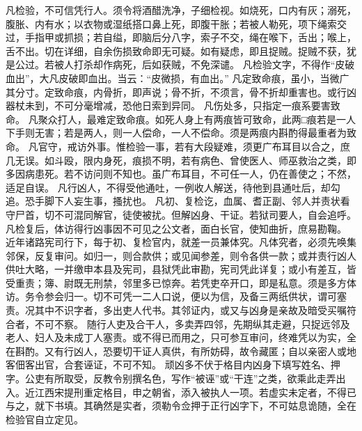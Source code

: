 \documentclass[12pt,UTF8]{ctexbook}
\begin{document}
凡检验，不可信凭行人。须令将酒醋洗净，子细检视。如烧死，口内有灰；溺死，腹胀、内有水；以衣物或湿纸搭口鼻上死，即腹干胀；若被人勒死，项下绳索交过，手指甲或抓损；若自缢，即脑后分八字，索子不交，绳在喉下，舌出；喉上，舌不出。切在详细，自余伤损致命即无可疑。如有疑虑，即且捉贼。捉贼不获，犹是公过。若被人打杀却作病死，后如获贼，不免深谴。
凡检验文字，不得作“皮破血出”，大凡皮破即血出。当云：“皮微损，有血出。”
凡定致命痕，虽小，当微广其分寸。定致命痕，内骨折，即声说；骨不折，不须言，骨不折却重害也。或行凶器杖未到，不可分毫增减，恐他日索到异同。
凡伤处多，只指定一痕系要害致命。
凡聚众打人，最难定致命痕。如死人身上有两痕皆可致命，此两□痕若是一人下手则无害；若是两人，则一人偿命，一人不偿命。须是两痕内斟酌得最重者为致命。
凡官守，戒访外事。惟检验一事，若有大段疑难，须更广布耳目以合之，庶几无误。如斗殴，限内身死，痕损不明，若有病色、曾使医人、师巫救治之类，即多因病患死。若不访问则不知也。虽广布耳目，不可任一人，仍在善使之；不然，适足自误。
凡行凶人，不得受他通吐，一例收人解送，待他到县通吐后，却勾追。恐手脚下人妄生事，搔扰也。
凡初、复检讫，血属、耆正副、邻人并责状看守尸首，切不可混同解官，徒使被扰。但解凶身、干证。若狱司要人，自会追呼。
凡检复后，体访得行凶事因不可见之公文者，面白长官，使知曲折，庶易勘鞠。
近年诸路宪司行下，每于初、复检官内，就差一员兼体究。凡体究者，必须先唤集邻保，反复审问。如归一，则合款供；或见闻参差，则令各供一款；或并责行凶人供吐大略，一并缴申本县及宪司，县狱凭此审勘，宪司凭此详复；或小有差互，皆受重责；簿、尉既无刑禁，邻里多已惊奔。若凭吏卒开口，即是私意。须是多方体访。务令参会归一。切不可凭一二人口说，便以为信，及备三两纸供状，谓可塞责。况其中不识字者，多出吏人代书。其邻证内，或又与凶身是亲故及暗受买嘱符合者，不可不察。
随行人吏及合干人，多卖弄四邻，先期纵其走避，只捉远邻及老人、妇人及未成丁人塞责。或不得已而用之，只可参互审问，终难凭以为实，全在斟酌。又有行凶人，恐要切干证人真供，有所妨碍，故令藏匿；自以亲密人或地客佃客出官，合套诬证，不可不知。
顽凶多不伏于格目内凶身下填写姓名、押字。公吏有所取受，反教令别撰名色，写作“被诬”或“干连”之类，欲乘此走弄出入。近江西宋提刑重定格目，申之朝省，添入被执人一项。若虚实未定者，不得已与之，就下书填。其确然是实者，须勒令佥押于正行凶字下，不可姑息诡随，全在检验官自立定见。
\end{document}
